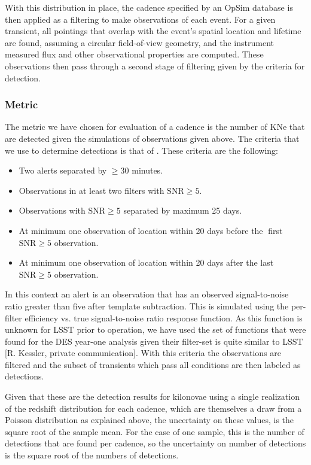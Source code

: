 With this distribution in place, the cadence specified by an OpSim database is then applied as a filtering to make observations of each event. For a given transient, all pointings that overlap with the event's spatial location and lifetime are found, assuming a circular field-of-view geometry, and the instrument measured flux and other observational properties are computed. These observations then pass through a second stage of filtering given by the criteria for detection.\par

\subsubsection{Metric}
The metric we have chosen for evaluation of a cadence is the number of KNe that are detected given the simulations of observations given above. The criteria that we use to determine detections is that of \citep{Scolnic2017a}. These criteria are the following:
\begin{itemize}
  \item Two alerts separated by $\geq 30$ minutes.
  \item Observations in at least two filters with $\mathrm{SNR} \geq 5$.
  \item Observations with $\mathrm{SNR} \geq 5$ separated by maximum 25 days.
  \item At minimum one observation of location within 20 days before the first $\mathrm{SNR} \geq 5$ observation.
  \item At minimum one observation of location within 20 days after the last $\mathrm{SNR} \geq 5$ observation.
\end{itemize}

In this context an alert is an observation that has an observed signal-to-noise ratio greater than five after template subtraction. This is simulated using the per-filter efficiency vs. true signal-to-noise ratio response function. As this function is unknown for LSST prior to operation, we have used the set of functions that were found for the DES year-one analysis given their filter-set is quite similar to LSST [R. Kessler, private communication]. With this criteria the observations are filtered and the subset of transients which pass all conditions are then labeled as detections.\par
Given that these are the detection results for kilonovae using a single realization of the redshift distribution for each cadence, which are themselves a draw from a Poisson distribution as explained above, the uncertainty on these values, is the square root of the sample mean. For the case of one sample, this is the number of detections that are found per cadence, so the uncertainty on number of detections is the square root of the numbers of detections.\par
